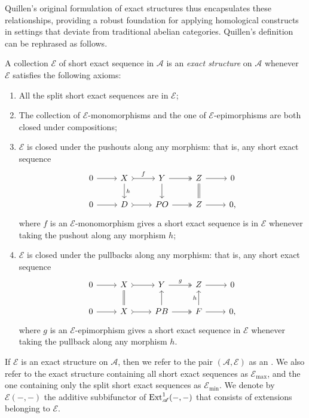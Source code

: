 Quillen's original formulation of exact structures thus encapsulates these relationships, providing a robust foundation for applying homological constructs in settings that deviate from traditional abelian categories. Quillen’s
definition can be rephrased as follows.

\begin{definition}\label{def:exact}
A collection $\mathcal{E}$ of short exact sequence in $\mathscr{A}$ is an \emph{exact structure} on $\mathscr{A}$ whenever $\mathcal{E}$ satisfies the following axioms:
\begin{enumerate}[label=$(\mathsf{ES} \arabic*)$,itemsep=1mm]
    \item \label{ES1} All the split short exact sequences are in $\mathcal{E}$;
  
    \item \label{ES2} The collection of $\mathcal{E}$-monomorphisms and the one of $\mathcal{E}$-epimorphisms are both closed under compositions;
    
    \item\label{ES3} $\mathcal{E}$ is closed under the pushouts along any morphism: that is, any short exact sequence \[\begin{tikzcd}
	0 & X & Y & Z & 0 \\ 0 & D & PO & Z & 0 ,
	\arrow[from=1-1, to=1-2]
	\arrow["f",tail, from=1-2, to=1-3]
	\arrow[two heads,from=1-3, to=1-4]
	\arrow[from=1-4, to=1-5]
    \arrow[from=2-1, to=2-2]
	\arrow[tail, from=2-2, to=2-3]
	\arrow[two heads,from=2-3, to=2-4]
	\arrow[from=2-4, to=2-5]
    \arrow["h",from=1-2, to=2-2]
	\arrow[from=1-3, to=2-3]
    \arrow[equal,from=1-4, to=2-4]
 \end{tikzcd} \] where $f$ is an $\mathcal{E}$-monomorphism gives a short exact sequence is in $\mathcal{E}$ whenever taking the pushout along any morphism $h$;
    
\item \label{ES4} $\mathcal{E}$ is closed under the pullbacks along any morphism: that is, any short exact sequence \[\begin{tikzcd}
	0 & X & Y & Z & 0 \\ 0 & X & PB & F & 0 ,
	\arrow[from=1-1, to=1-2]
	\arrow[tail, from=1-2, to=1-3]
	\arrow["g",two heads,from=1-3, to=1-4]
	\arrow[from=1-4, to=1-5]
    \arrow[from=2-1, to=2-2]
	\arrow[tail, from=2-2, to=2-3]
	\arrow[two heads,from=2-3, to=2-4]
	\arrow[from=2-4, to=2-5]
    \arrow[equal,from=1-2, to=2-2]
	\arrow[from=2-3, to=1-3]
    \arrow["h",from=2-4, to=1-4]
 \end{tikzcd} \]where $g$ is an $\mathcal{E}$-epimorphism gives a short exact sequence in $\mathcal{E}$ whenever taking the pullback along any morphism $h$.
\end{enumerate}
If $\mathcal{E}$ is an exact structure on $\mathscr{A}$, then we refer to the pair $(\mathscr{A},\mathcal{E})$ as an . We also refer to the exact structure containing all short exact sequences as $\mathcal{E}_{\max}$, and the one containing only the split short exact sequences as $\mathcal{E}_{\min}$. We denote by $\mathcal{E}(-,-)$ the additive subbifunctor of $\operatorname{Ext}^1_\mathscr{A}(-,-)$ that consists of extensions belonging to $\mathcal{E}$.


\end{definition}
